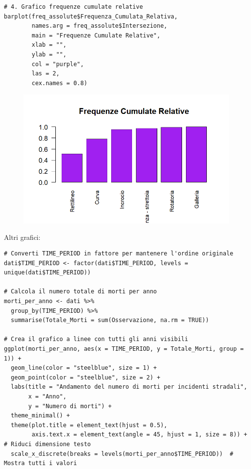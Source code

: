 \documentclass[14pt, openany, titlepage]{report} %
\begin{document}
\begin{center}
\begin{lstlisting}[breaklines=true]
# 4. Grafico frequenze cumulate relative
barplot(freq_assolute$Frequenza_Cumulata_Relativa, 
        names.arg = freq_assolute$Intersezione,
        main = "Frequenze Cumulate Relative",
        xlab = "",
        ylab = "",
        col = "purple",
        las = 2,
        cex.names = 0.8)
\end{lstlisting}  
\end{center}

\begin{figure}[H] %
    \centering
    \includegraphics[width=12cm, height=7cm]{Rplot05.png} %
\end{figure}

Altri grafici:
\begin{center}
\begin{lstlisting}[breaklines=true]
# Converti TIME_PERIOD in fattore per mantenere l'ordine originale
dati$TIME_PERIOD <- factor(dati$TIME_PERIOD, levels = unique(dati$TIME_PERIOD))

# Calcola il numero totale di morti per anno
morti_per_anno <- dati %>%
  group_by(TIME_PERIOD) %>%
  summarise(Totale_Morti = sum(Osservazione, na.rm = TRUE))

# Crea il grafico a linee con tutti gli anni visibili
ggplot(morti_per_anno, aes(x = TIME_PERIOD, y = Totale_Morti, group = 1)) +
  geom_line(color = "steelblue", size = 1) +
  geom_point(color = "steelblue", size = 2) +
  labs(title = "Andamento del numero di morti per incidenti stradali",
       x = "Anno",
       y = "Numero di morti") +
  theme_minimal() +
  theme(plot.title = element_text(hjust = 0.5),
        axis.text.x = element_text(angle = 45, hjust = 1, size = 8)) +  # Riduci dimensione testo
  scale_x_discrete(breaks = levels(morti_per_anno$TIME_PERIOD))  # Mostra tutti i valori
\end{lstlisting}  
\end{center}
\end{document}
